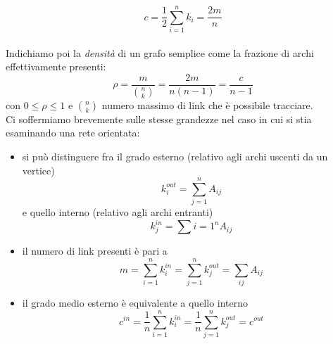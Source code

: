 \begin{equation}
 	c = \frac{1}{2} \sum_{i=1}^n k_i = \frac{2m}{n} 
\end{equation}
 \\Indichiamo poi la \emph{densità} di un grafo semplice come la frazione di archi effettivamente presenti:
\begin{equation}
	\rho = \frac{m}{\binom{n}{k}} = \frac{2m}{n\left(n-1 \right)} = \frac{c}{n-1}
\end{equation}
con $ 0 \leq \rho \leq  1 $ e  $ \binom{n}{k} $  numero massimo di link che è possibile tracciare. \\Ci soffermiamo brevemente sulle stesse grandezze nel caso in cui si stia esaminando una rete orientata:
\begin{itemize}
\item si può distinguere fra il grado esterno (relativo agli archi uscenti da un vertice)
	\begin{equation}
		k_{i}^{out} = \sum_{j=1}^n A_{ij}	
	\end{equation}
e quello interno (relativo agli archi entranti)
	\begin{equation}
		k_{j}^{in} = \sum{i=1}^n A_{ij}
	\end{equation}
\item il numero di link presenti è pari a
	\begin{equation}
		m = \sum_{i=1}^n k_i^{in} = \sum_{j=1}^n k_j^{out} = \sum_{ij} A_{ij}
	\end{equation}
\item il grado medio esterno è equivalente a quello interno
	\begin{equation}
		c^{in} = \frac{1}{n} \sum_{i=1}^n k_i^{in} = \frac{1}{n} \sum_{j=1}^n k_j^{out} = c^{out}
	\end{equation}
\end{itemize}
%
%
%



